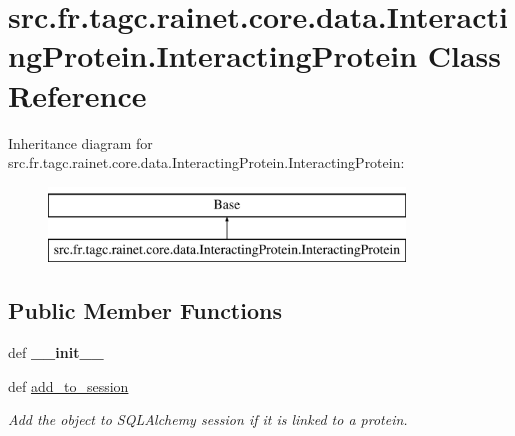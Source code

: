 \hypertarget{classsrc_1_1fr_1_1tagc_1_1rainet_1_1core_1_1data_1_1InteractingProtein_1_1InteractingProtein}{\section{src.\-fr.\-tagc.\-rainet.\-core.\-data.\-Interacting\-Protein.\-Interacting\-Protein Class Reference}
\label{classsrc_1_1fr_1_1tagc_1_1rainet_1_1core_1_1data_1_1InteractingProtein_1_1InteractingProtein}
}
Inheritance diagram for src.\-fr.\-tagc.\-rainet.\-core.\-data.\-Interacting\-Protein.\-Interacting\-Protein\-:\begin{figure}[H]
\begin{center}
\leavevmode
\includegraphics[height=2.000000cm]{classsrc_1_1fr_1_1tagc_1_1rainet_1_1core_1_1data_1_1InteractingProtein_1_1InteractingProtein}
\end{center}
\end{figure}
\subsection*{Public Member Functions}
\begin{DoxyCompactItemize}
\item 
\hypertarget{classsrc_1_1fr_1_1tagc_1_1rainet_1_1core_1_1data_1_1InteractingProtein_1_1InteractingProtein_a8b8919e52da2bdae7352d25902286d30}{def {\bfseries \-\_\-\-\_\-init\-\_\-\-\_\-}}\label{classsrc_1_1fr_1_1tagc_1_1rainet_1_1core_1_1data_1_1InteractingProtein_1_1InteractingProtein_a8b8919e52da2bdae7352d25902286d30}

\item 
\hypertarget{classsrc_1_1fr_1_1tagc_1_1rainet_1_1core_1_1data_1_1InteractingProtein_1_1InteractingProtein_a8e522e5e5371f020db5afc846da20071}{def \hyperlink{classsrc_1_1fr_1_1tagc_1_1rainet_1_1core_1_1data_1_1InteractingProtein_1_1InteractingProtein_a8e522e5e5371f020db5afc846da20071}{add\-\_\-to\-\_\-session}}\label{classsrc_1_1fr_1_1tagc_1_1rainet_1_1core_1_1data_1_1InteractingProtein_1_1InteractingProtein_a8e522e5e5371f020db5afc846da20071}

\begin{DoxyCompactList}\small\item\em Add the object to S\-Q\-L\-Alchemy session if it is linked to a protein. \end{DoxyCompactList}\end{DoxyCompactItemize}
